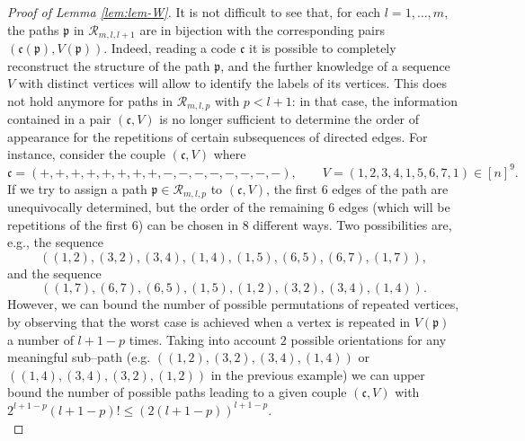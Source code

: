 \documentclass[11pt,oneside]{amsart}
\theoremstyle{plain}
\numberwithin{equation}{section}
\newcommand{\pat}{\mathfrak{p}}
\begin{document}
\begin{proof}[Proof of Lemma \ref{lem:lem-W}]
It is not difficult to see that, for each $l=1,\dots,m$, the paths $\pat$ in $\mathcal{R}_{m,l,l+1}$ 
are in bijection with the corresponding pairs $(\mathfrak{c}(\pat),V(\pat))$. Indeed, reading a code $\mathfrak{c}$ it is possible to completely reconstruct the structure of the path $\pat$, and the further knowledge of a sequence $V$ with distinct vertices will allow to identify the labels of its vertices. This does not hold anymore for paths in $\mathcal{R}_{m,l,p}$ with $p <l+1$: in that case, the information contained in a pair $(\mathfrak{c},V)$ is no longer sufficient to determine the order of appearance for the repetitions of certain subsequences of directed edges. For instance, consider the couple $(\mathfrak{c},V)$ where
$$\mathfrak{c}=(+,+,+,+,+,+,+,+,-,-,-,-,-,-,-,-), \qquad V=(1,2,3,4,1,5,6,7,1) \in [n]^9.$$
If we try to assign a path $\pat \in \mathcal{R}_{m,l,p}$ to $(\mathfrak{c},V)$, the first $6$ edges of the path are unequivocally determined, but the order of the remaining $6$ edges (which will be repetitions of the first $6$) can be chosen in $8$ different ways. Two possibilities 
are, e.g., the sequence
$$((1,2),(3,2),(3,4),(1,4),(1,5),(6,5),(6,7),(1,7)),$$ and the sequence $$((1,7),(6,7),(6,5),(1,5),(1,2),(3,2),(3,4),(1,4)).$$
However, we can bound the number of possible permutations of repeated vertices, by observing that the worst case is achieved when a vertex is repeated in $V(\pat)$ a number of $l+1-p$ times. Taking into account $2$ possible orientations for any meaningful sub--path (e.g. $((1,2),(3,2),(3,4),(1,4))$ or $((1,4),(3,4),(3,2),(1,2))$ in the previous example) we can upper bound the number of
possible paths leading to a given couple $(\mathfrak{c},V)$ with  $2^{l+1-p} (l+1-p)! \le  (2 (l+1-p))^{l+1-p}$.\\


\end{proof}
\end{document}
